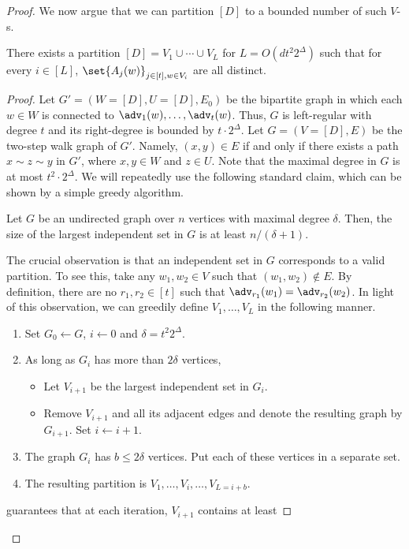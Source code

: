 \begin{proof}
We now argue that we can partition $[D]$ to a bounded number of such $V$-s.
\begin{lemma}
There exists a partition $[D] = V_1 \cup \cdots \cup V_L$ for $L = O(dt^2  2^{\Delta})$
such that for every $i \in [L]$, $\set{A_{j}(w)}_{j \in [t],w \in V_i}$ are all distinct.
\end{lemma}
\begin{proof}
Let $G' = (W = [D],U = [D],E_0)$ be the bipartite graph in which each $w \in W$ is
connected to $\adv_{1}(w),\ldots,\adv_{t}(w)$. Thus, $G$ is left-regular with degree $t$
and its right-degree is bounded by $t \cdot 2^{\Delta}$. Let $G = (V = [D],E)$ be the
two-step walk graph of $G'$. Namely, $(x,y) \in E$ if and only if there exists a path
$x \sim z \sim y$ in $G'$, where $x,y \in W$ and $z \in U$. 
Note that the maximal degree in $G$ is at most $t^{2} \cdot 2^{\Delta}$.
We will repeatedly use
the following standard claim, which can be shown by a simple greedy algorithm.
\begin{claim}\label{claim:aux}
Let $G$ be an undirected graph over $n$ vertices with maximal degree $\delta$.
Then, the size of the largest independent set in $G$ is at least 
%
%
$n/(\delta+1)$.
%
%
%
\end{claim}
The crucial observation is that an independent set in $G$ corresponds to a valid partition.
To see this, take any $w_1,w_2 \in V$ such that $(w_1,w_2) \notin E$. By definition, there are no
$r_1,r_2 \in [t]$ such that $\adv_{r_1}(w_1) = \adv_{r_2}(w_2)$. In light of this observation,
we can greedily define $V_1,\ldots,V_{L}$ in the following manner.
\begin{enumerate}
\item	Set $G_0 \leftarrow G$, $i \leftarrow 0$ and $\delta = t^{2}2^{\Delta}$.
\item	As long as $G_i$ has more than $2\delta$ vertices,
\begin{itemize}
\item	Let $V_{i+1}$ be the largest independent set in $G_{i}$.
\item	Remove $V_{i+1}$ and all its adjacent edges and denote the resulting graph by $G_{i+1}$.
Set $i \leftarrow i+1$.
\end{itemize} 
\item	The graph $G_i$ has $b \le 2\delta$ vertices. Put each of these vertices in a separate
set.
\item	The resulting partition is $V_{1},\ldots,V_{i},\ldots,V_{L = i+b}$.
\end{enumerate}
 guarantees that at each iteration, $V_{i+1}$ contains at least 

\end{proof}
\end{proof}
